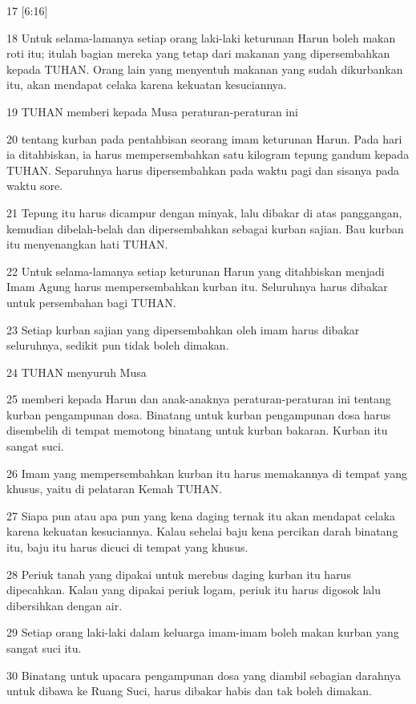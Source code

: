 \par 17 [6:16]
\par 18 Untuk selama-lamanya setiap orang laki-laki keturunan Harun boleh makan roti itu; itulah bagian mereka yang tetap dari makanan yang dipersembahkan kepada TUHAN. Orang lain yang menyentuh makanan yang sudah dikurbankan itu, akan mendapat celaka karena kekuatan kesuciannya.
\par 19 TUHAN memberi kepada Musa peraturan-peraturan ini
\par 20 tentang kurban pada pentahbisan seorang imam keturunan Harun. Pada hari ia ditahbiskan, ia harus mempersembahkan satu kilogram tepung gandum kepada TUHAN. Separuhnya harus dipersembahkan pada waktu pagi dan sisanya pada waktu sore.
\par 21 Tepung itu harus dicampur dengan minyak, lalu dibakar di atas panggangan, kemudian dibelah-belah dan dipersembahkan sebagai kurban sajian. Bau kurban itu menyenangkan hati TUHAN.
\par 22 Untuk selama-lamanya setiap keturunan Harun yang ditahbiskan menjadi Imam Agung harus mempersembahkan kurban itu. Seluruhnya harus dibakar untuk persembahan bagi TUHAN.
\par 23 Setiap kurban sajian yang dipersembahkan oleh imam harus dibakar seluruhnya, sedikit pun tidak boleh dimakan.
\par 24 TUHAN menyuruh Musa
\par 25 memberi kepada Harun dan anak-anaknya peraturan-peraturan ini tentang kurban pengampunan dosa. Binatang untuk kurban pengampunan dosa harus disembelih di tempat memotong binatang untuk kurban bakaran. Kurban itu sangat suci.
\par 26 Imam yang mempersembahkan kurban itu harus memakannya di tempat yang khusus, yaitu di pelataran Kemah TUHAN.
\par 27 Siapa pun atau apa pun yang kena daging ternak itu akan mendapat celaka karena kekuatan kesuciannya. Kalau sehelai baju kena percikan darah binatang itu, baju itu harus dicuci di tempat yang khusus.
\par 28 Periuk tanah yang dipakai untuk merebus daging kurban itu harus dipecahkan. Kalau yang dipakai periuk logam, periuk itu harus digosok lalu dibersihkan dengan air.
\par 29 Setiap orang laki-laki dalam keluarga imam-imam boleh makan kurban yang sangat suci itu.
\par 30 Binatang untuk upacara pengampunan dosa yang diambil sebagian darahnya untuk dibawa ke Ruang Suci, harus dibakar habis dan tak boleh dimakan.

